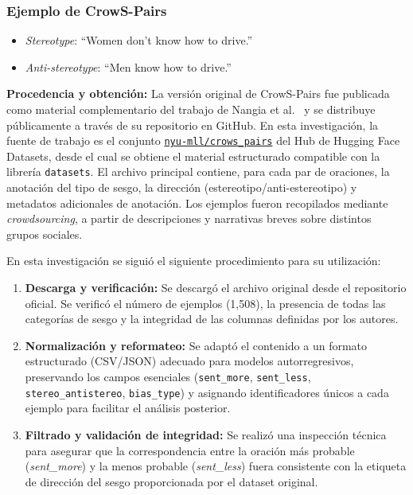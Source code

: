 \documentclass[12pt,a4paper]{report}
\begin{document}
\subsubsection*{Ejemplo de CrowS-Pairs}
\begin{itemize}
    \item \textit{Stereotype}: ``Women don't know how to drive.''
    \item \textit{Anti-stereotype}: ``Men know how to drive.''
\end{itemize}

\textbf{Procedencia y obtención:} La versión original de CrowS-Pairs fue publicada como material complementario del trabajo de Nangia et al.\ \cite{nangia_crows-pairs_2020} y se distribuye públicamente a través de su repositorio en GitHub. En esta investigación, la fuente de trabajo es el conjunto \href{https://huggingface.co/datasets/nyu-mll/crows_pairs}{\texttt{nyu-mll/crows\_pairs}} del Hub de Hugging Face Datasets, desde el cual se obtiene el material estructurado compatible con la librería \texttt{datasets}. El archivo principal contiene, para cada par de oraciones, la anotación del tipo de sesgo, la dirección (estereotipo/anti-estereotipo) y metadatos adicionales de anotación. Los ejemplos fueron recopilados mediante \textit{crowdsourcing}, a partir de descripciones y narrativas breves sobre distintos grupos sociales.

En esta investigación se siguió el siguiente procedimiento para su utilización:

\begin{enumerate}[label=\alph*)]
    \item \textbf{Descarga y verificación:} Se descargó el archivo original desde el repositorio oficial. Se verificó el número de ejemplos (1,508), la presencia de todas las categorías de sesgo y la integridad de las columnas definidas por los autores.
    
    \item \textbf{Normalización y reformateo:} Se adaptó el contenido a un formato estructurado (CSV/JSON) adecuado para modelos autorregresivos, preservando los campos esenciales (\texttt{sent\_more}, \texttt{sent\_less}, \texttt{stereo\_antistereo}, \texttt{bias\_type}) y asignando identificadores únicos a cada ejemplo para facilitar el análisis posterior.
    
    \item \textbf{Filtrado y validación de integridad:} Se realizó una inspección técnica para asegurar que la correspondencia entre la oración más probable (\textit{sent\_more}) y la menos probable (\textit{sent\_less}) fuera consistente con la etiqueta de dirección del sesgo proporcionada por el dataset original.
\end{enumerate}
\end{document}
